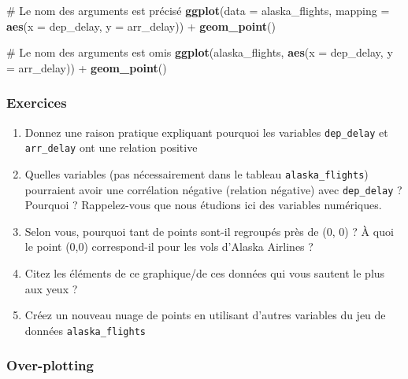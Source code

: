 \documentclass[
  a4paper,
]{article}
\newenvironment{Shaded}{\begin{snugshade}}{\end{snugshade}}
\newcommand{\CommentTok}[1]{\textcolor[rgb]{0.54,0.53,0.53}{#1}}
\newcommand{\DataTypeTok}[1]{\textcolor[rgb]{0.00,0.34,0.68}{#1}}
\newcommand{\KeywordTok}[1]{\textcolor[rgb]{0.12,0.11,0.11}{\textbf{#1}}}
\newcommand{\NormalTok}[1]{\textcolor[rgb]{0.12,0.11,0.11}{#1}}
\newcommand{\OperatorTok}[1]{\textcolor[rgb]{0.12,0.11,0.11}{#1}}
\newcommand{\StringTok}[1]{\textcolor[rgb]{0.75,0.01,0.01}{#1}}
\providecommand{\tightlist}{%
  \setlength{\itemsep}{0pt}\setlength{\parskip}{0pt}}
\begin{document}
\begin{Shaded}
\begin{Highlighting}[]
\CommentTok{# Le nom des arguments est précisé}
\KeywordTok{ggplot}\NormalTok{(}\DataTypeTok{data =}\NormalTok{ alaska_flights, }\DataTypeTok{mapping =} \KeywordTok{aes}\NormalTok{(}\DataTypeTok{x =}\NormalTok{ dep_delay, }\DataTypeTok{y =}\NormalTok{ arr_delay)) }\OperatorTok{+}\StringTok{ }
\StringTok{  }\KeywordTok{geom_point}\NormalTok{()}

\CommentTok{# Le nom des arguments est omis}
\KeywordTok{ggplot}\NormalTok{(alaska_flights, }\KeywordTok{aes}\NormalTok{(}\DataTypeTok{x =}\NormalTok{ dep_delay, }\DataTypeTok{y =}\NormalTok{ arr_delay)) }\OperatorTok{+}\StringTok{ }
\StringTok{  }\KeywordTok{geom_point}\NormalTok{()}
\end{Highlighting}
\end{Shaded}

\hypertarget{Exo-4}{%
\subsubsection{Exercices}\label{Exo-4}}

\begin{enumerate}
\def\labelenumi{\arabic{enumi}.}
\tightlist
\item
  Donnez une raison pratique expliquant pourquoi les variables \texttt{dep\_delay} et \texttt{arr\_delay} ont une relation positive
\item
  Quelles variables (pas nécessairement dans le tableau \texttt{alaska\_flights}) pourraient avoir une corrélation négative (relation négative) avec \texttt{dep\_delay} ? Pourquoi ? Rappelez-vous que nous étudions ici des variables numériques.
\item
  Selon vous, pourquoi tant de points sont-il regroupés près de (0, 0) ? À quoi le point (0,0) correspond-il pour les vols d'Alaska Airlines ?
\item
  Citez les éléments de ce graphique/de ces données qui vous sautent le plus aux yeux ?
\item
  Créez un nouveau nuage de points en utilisant d'autres variables du jeu de données \texttt{alaska\_flights}
\end{enumerate}

\hypertarget{over-plotting}{%
\subsubsection{Over-plotting}\label{over-plotting}}
\end{document}

